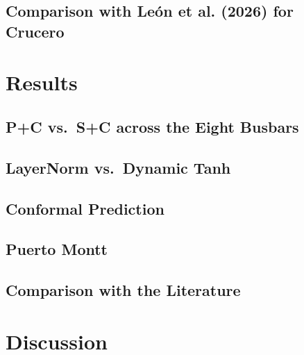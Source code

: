 \documentclass[applsci,article,submit,moreauthors,pdftex]{Definitions/mdpi}
\begin{document}
\subsection{Comparison with Le\'on et al. (2026) for Crucero}

\section{Results}
\label{sec:results}

\subsection{P+C vs.\ S+C across the Eight Busbars}

\subsection{LayerNorm vs.\ Dynamic Tanh}

\subsection{Conformal Prediction}

\subsection{Puerto Montt}

\subsection{Comparison with the Literature}

\section{Discussion}
\label{sec:discussion}
\end{document}
